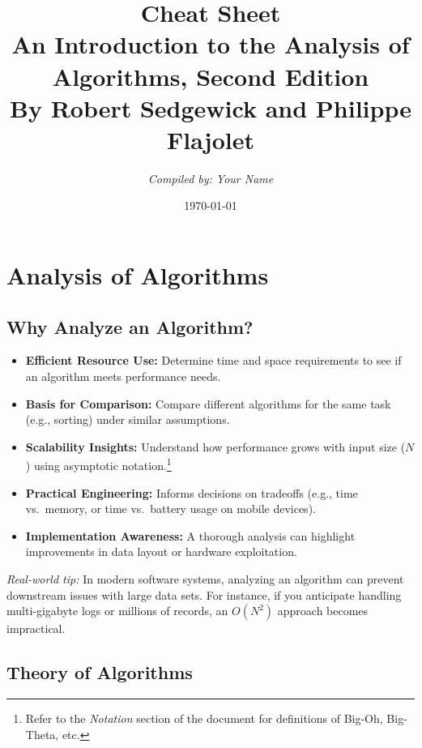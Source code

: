 \documentclass[11pt,letterpaper]{article}
\title{\textbf{Cheat Sheet}\\
\large \textbf{An Introduction to the Analysis of Algorithms, Second Edition}\\
\small By Robert Sedgewick and Philippe Flajolet}
\author{\textit{Compiled by: Your Name}}
\date{\today}
\begin{document}
\maketitle
\tableofcontents
\clearpage

\section{Analysis of Algorithms}

\subsection{Why Analyze an Algorithm?}

\begin{itemize}
  \item \textbf{Efficient Resource Use:} Determine time and space requirements to see if an algorithm meets performance needs.
  \item \textbf{Basis for Comparison:} Compare different algorithms for the same task (e.g., sorting) under similar assumptions.
  \item \textbf{Scalability Insights:} Understand how performance grows with input size (\(N\)) using asymptotic notation.\footnote{Refer to the \emph{Notation} section of the document for definitions of Big-Oh, Big-Theta, etc.}
  \item \textbf{Practical Engineering:} Informs decisions on tradeoffs (e.g., time vs.\ memory, or time vs.\ battery usage on mobile devices).
  \item \textbf{Implementation Awareness:} A thorough analysis can highlight improvements in data layout or hardware exploitation.
\end{itemize}

\noindent
\emph{Real-world tip:} In modern software systems, analyzing an algorithm can prevent downstream issues with large data sets. For instance, if you anticipate handling multi-gigabyte logs or millions of records, an \(O(N^2)\) approach becomes impractical.

\subsection{Theory of Algorithms}
\end{document}
